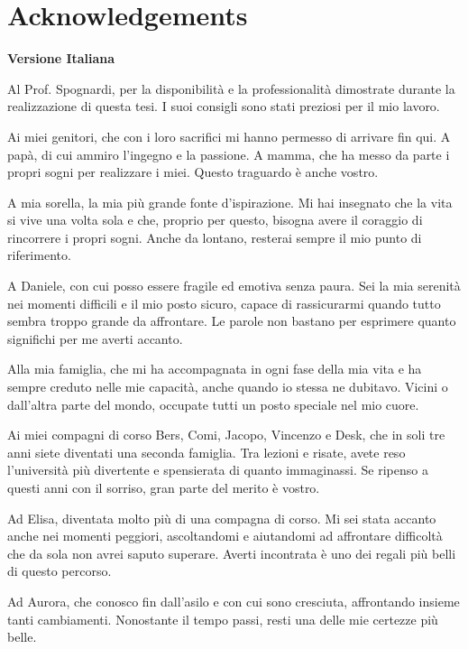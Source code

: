 \chapter*{Acknowledgements}
{}

\small\textbf{Versione Italiana}

\begingroup
\setlength{\parskip}{0.5em}

Al Prof. Spognardi,
per la disponibilità e la professionalità dimostrate durante
la realizzazione di questa tesi. I suoi consigli sono stati
preziosi per il mio lavoro.

Ai miei genitori,
che con i loro sacrifici mi hanno permesso di arrivare fin qui.
A papà, di cui ammiro l'ingegno e la passione.
A mamma, che ha messo da parte i propri sogni per realizzare
i miei. Questo traguardo è anche vostro.

A mia sorella,
la mia più grande fonte d'ispirazione. Mi hai insegnato che la vita
si vive una volta sola e che, proprio per questo, bisogna avere il
coraggio di rincorrere i propri sogni. Anche da lontano,
resterai sempre il mio punto di riferimento.

A Daniele,
con cui posso essere fragile ed emotiva senza paura.
Sei la mia serenità nei momenti difficili e il mio posto sicuro,
capace di rassicurarmi quando tutto sembra troppo grande
da affrontare. Le parole non bastano per esprimere quanto
significhi per me averti accanto.

Alla mia famiglia,
che mi ha accompagnata in ogni fase della mia vita e ha sempre
creduto nelle mie capacità, anche quando io stessa ne dubitavo.
Vicini o dall'altra parte del mondo, occupate tutti
un posto speciale nel mio cuore.

Ai miei compagni di corso Bers, Comi, Jacopo, Vincenzo e Desk,
che in soli tre anni siete diventati una seconda famiglia.
Tra lezioni e risate, avete reso l'università più divertente
e spensierata di quanto immaginassi. Se ripenso a questi anni
con il sorriso, gran parte del merito è vostro.

Ad Elisa,
diventata molto più di una compagna di corso.
Mi sei stata accanto anche nei momenti peggiori, ascoltandomi
e aiutandomi ad affrontare difficoltà che da sola non avrei
saputo superare. Averti incontrata è uno dei regali più belli
di questo percorso.

Ad Aurora,
che conosco fin dall'asilo e con cui sono cresciuta,
affrontando insieme tanti cambiamenti.
Nonostante il tempo passi, resti una delle mie certezze più belle.

